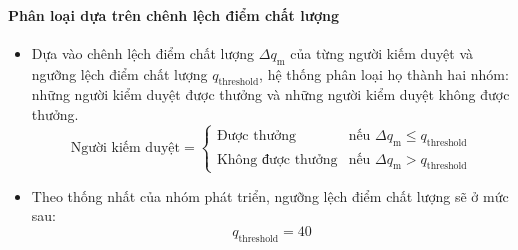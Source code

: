\paragraph{Phân loại dựa trên chênh lệch điểm chất lượng}
\begin{itemize}
  \item Dựa vào chênh lệch điểm chất lượng $\Delta q_{\text{m}}$ của từng người kiếm duyệt và ngưỡng lệch điểm chất lượng $q_{\text{threshold}}$, hệ thống phân loại họ thành hai nhóm: những người kiểm duyệt được thưởng và những người kiểm duyệt không được thưởng. 
    \[
    \text{Người kiếm duyệt} =
    \begin{cases}
      \text{Được thưởng} & \text{nếu } \Delta q_{\text{m}} \leq q_{\text{threshold}} \\
      \text{Không được thưởng} & \text{nếu } \Delta q_{\text{m}} > q_{\text{threshold}}
    \end{cases}
    \]
  \item Theo thống nhất của nhóm phát triển, ngưỡng lệch điểm chất lượng sẽ ở mức sau:
    \[q_{\text{threshold}} = 40 \]

\end{itemize}

